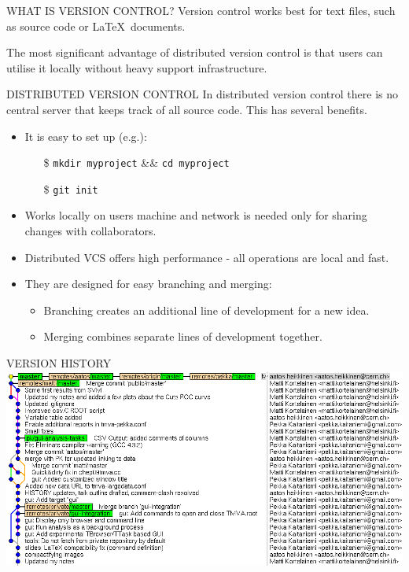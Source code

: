 \documentclass[final,hyperref={pdfpagelabels=false},notitlepage=true]{beamer}
\begin{document}
\begin{frame}{}
\begin{columns}[t]
\begin{column}{0.45\linewidth}
\begin{block}{\large WHAT IS VERSION CONTROL?}
      \vskip1cm
      Version control {\color{orange} works best for} text files, such as {\color{orange} source code} or \LaTeX\ documents.

\vskip1cm
The most significant advantage of distributed version control is that 
users can utilise it locally without heavy support infrastructure.

    \end{block}

    \vskip2cm
    \begin{block}{\large DISTRIBUTED VERSION CONTROL}
      \vskip1cm
      In distributed version control there is {\color{orange} no central server}
      that keeps track of all source code. This has several benefits.
      \vskip1cm
      \begin{itemize}
        \item It is easy to set up (e.g.):
          \begin{itemize}
            \item[\$] {\tt mkdir myproject} \&\& {\tt cd myproject}
            \item[\$] {\tt git init}
          \end{itemize}
          \vskip1cm
        \item Works locally on users machine and network is needed
          only for sharing changes with collaborators.
          \vskip1cm
        \item Distributed VCS offers high performance - all operations are local and fast.
          \vskip1cm
        \item They are {\color{orange} designed for easy branching and merging}:
          \begin{itemize}
            \item Branching creates an additional line of
              development for a new idea.
            \item Merging combines separate lines of development
              together.
          \end{itemize}
      \end{itemize}
    \end{block}

    \vskip2cm
    \begin{block}{\large VERSION HISTORY}
      \vskip1cm
      \includegraphics[width=1.0\linewidth]{images/gitk-history-detail.png}
    \end{block}


\end{column}
\end{columns}
\end{frame}
\end{document}
